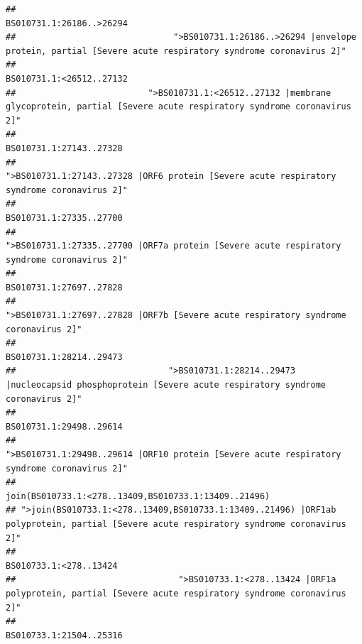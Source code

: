 \documentclass[
]{article}
\begin{document}
\begin{verbatim}
##                                                                                                               BS010731.1:26186..>26294 
##                               ">BS010731.1:26186..>26294 |envelope protein, partial [Severe acute respiratory syndrome coronavirus 2]" 
##                                                                                                               BS010731.1:<26512..27132 
##                          ">BS010731.1:<26512..27132 |membrane glycoprotein, partial [Severe acute respiratory syndrome coronavirus 2]" 
##                                                                                                                BS010731.1:27143..27328 
##                                             ">BS010731.1:27143..27328 |ORF6 protein [Severe acute respiratory syndrome coronavirus 2]" 
##                                                                                                                BS010731.1:27335..27700 
##                                            ">BS010731.1:27335..27700 |ORF7a protein [Severe acute respiratory syndrome coronavirus 2]" 
##                                                                                                                BS010731.1:27697..27828 
##                                                    ">BS010731.1:27697..27828 |ORF7b [Severe acute respiratory syndrome coronavirus 2]" 
##                                                                                                                BS010731.1:28214..29473 
##                              ">BS010731.1:28214..29473 |nucleocapsid phosphoprotein [Severe acute respiratory syndrome coronavirus 2]" 
##                                                                                                                BS010731.1:29498..29614 
##                                            ">BS010731.1:29498..29614 |ORF10 protein [Severe acute respiratory syndrome coronavirus 2]" 
##                                                                                   join(BS010733.1:<278..13409,BS010733.1:13409..21496) 
## ">join(BS010733.1:<278..13409,BS010733.1:13409..21496) |ORF1ab polyprotein, partial [Severe acute respiratory syndrome coronavirus 2]" 
##                                                                                                                 BS010733.1:<278..13424 
##                                ">BS010733.1:<278..13424 |ORF1a polyprotein, partial [Severe acute respiratory syndrome coronavirus 2]" 
##                                                                                                                BS010733.1:21504..25316 

\end{verbatim}
\end{document}
